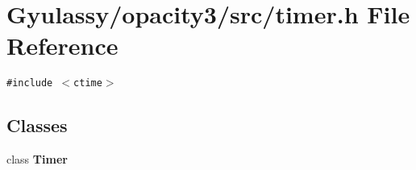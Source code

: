 \section{Gyulassy/opacity3/src/timer.h File Reference}
\label{timer_8h}
{\tt \#include $<$ctime$>$}\par
\subsection*{Classes}
\begin{CompactItemize}
\item 
class {\bf Timer}
\end{CompactItemize}
